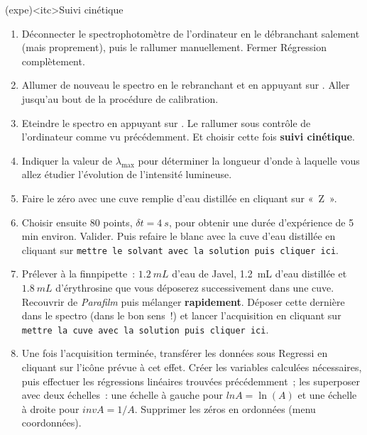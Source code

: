 \documentclass[../main/main.tex]{subfiles}
\begin{document}
\begin{tcb}[breakable](expe)<itc>{Suivi cinétique}
	\begin{enumerate}
		\item Déconnecter le spectrophotomètre de l'ordinateur en le débranchant
		      salement (mais proprement), puis le rallumer manuellement. Fermer
		      Régression complètement.
		\item Allumer de nouveau le spectro en le rebranchant et en appuyant sur
		      . Aller jusqu'au bout de la procédure de calibration.
		\item Eteindre le spectro en appuyant sur . Le rallumer sous
		      contrôle de l'ordinateur comme vu précédemment. Et choisir cette fois
		      \textbf{suivi cinétique}.
		\item Indiquer la valeur de $\lambda_{\max}$ pour déterminer la longueur
		      d'onde à laquelle vous allez étudier l'évolution de l'intensité
		      lumineuse.
		\item Faire le zéro avec une cuve remplie d'eau distillée en cliquant sur
		      «~Z~».
		\item Choisir ensuite 80 points, $\delta t=\SI{4}{s}$, pour obtenir une durée
		      d'expérience de 5 min environ. Valider. Puis refaire le blanc avec la
		      cuve d'eau distillée en cliquant sur \texttt{mettre le solvant avec la
			      solution puis cliquer ici}.
		\item Prélever à la finnpipette~: $\SI{1,2}{mL}$ d'eau de Javel,
		      \SI{1.2}{mL} d'eau distillée et $\SI{1,8}{mL}$ d'érythrosine que vous
		      déposerez successivement dans une cuve. Recouvrir de \textit{Parafilm}
		      puis mélanger \textbf{rapidement}. Déposer cette dernière dans le spectro
		      (dans le bon sens~!) et lancer l'acquisition en cliquant sur
		      \texttt{mettre la cuve avec la solution puis cliquer ici}.
		\item Une fois l'acquisition terminée, transférer les données sous Regressi en
		      cliquant sur l'icône prévue à cet effet. Créer les variables calculées
		      nécessaires, puis effectuer les régressions linéaires trouvées précédemment~;
		      les superposer avec deux échelles~: une échelle à gauche pour $lnA = \ln(A)$
		      et une échelle à droite pour $invA = 1 / A$. Supprimer les zéros en ordonnées
		      (menu coordonnées).
	\end{enumerate}
\end{tcb}
\end{document}
